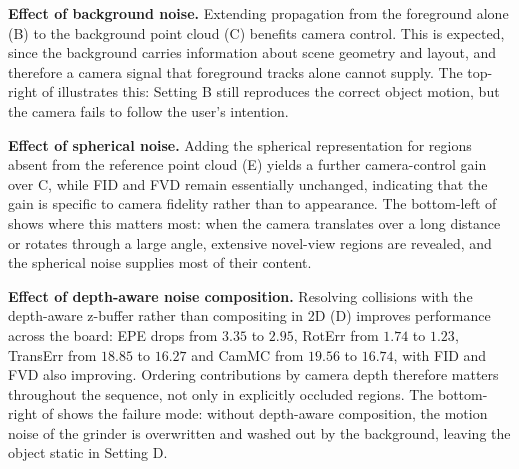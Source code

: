 \ifdefined\arxivbuild\else\documentclass{article}\fi %
\begin{document}
\noindent\textbf{Effect of background noise.}
Extending propagation from the foreground alone (B) to the background point cloud (C) benefits camera control. This is expected, since the background carries information about scene geometry and layout, and therefore a camera signal that foreground tracks alone cannot supply. The top-right of  illustrates this: Setting B still reproduces the correct object motion, but the camera fails to follow the user's intention.

\noindent\textbf{Effect of spherical noise.}
Adding the spherical representation for regions absent from the reference point cloud (E) yields a further camera-control gain over C, while FID and FVD remain essentially unchanged, indicating that the gain is specific to camera fidelity rather than to appearance. The bottom-left of  shows where this matters most: when the camera translates over a long distance or rotates through a large angle, extensive novel-view regions are revealed, and the spherical noise supplies most of their content.

\noindent\textbf{Effect of depth-aware noise composition.}
Resolving collisions with the depth-aware z-buffer rather than compositing in 2D (D) improves performance across the board: EPE drops from $3.35$ to $2.95$, RotErr from $1.74$ to $1.23$, TransErr from $18.85$ to $16.27$ and CamMC from $19.56$ to $16.74$, with FID and FVD also improving. Ordering contributions by camera depth therefore matters throughout the sequence, not only in explicitly occluded regions. The bottom-right of  shows the failure mode: without depth-aware composition, the motion noise of the grinder is overwritten and washed out by the background, leaving the object static in Setting D.




\end{document}

